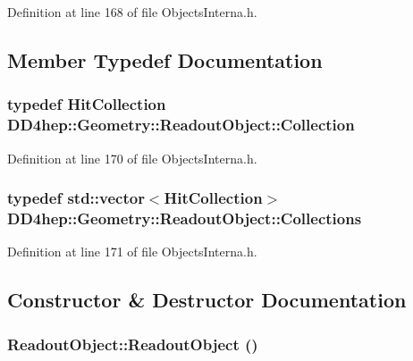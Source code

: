 Definition at line 168 of file ObjectsInterna.h.

\subsection{Member Typedef Documentation}
\hypertarget{class_d_d4hep_1_1_geometry_1_1_readout_object_a3789c1e548f014ce44e2af9ff12f9757}{
\subsubsection[{Collection}]{\setlength{\rightskip}{0pt plus 5cm}typedef {\bf HitCollection} {\bf DD4hep::Geometry::ReadoutObject::Collection}}}
\label{class_d_d4hep_1_1_geometry_1_1_readout_object_a3789c1e548f014ce44e2af9ff12f9757}


Definition at line 170 of file ObjectsInterna.h.\hypertarget{class_d_d4hep_1_1_geometry_1_1_readout_object_a1093be792a71654cf6116686b0ab7cb6}{
\subsubsection[{Collections}]{\setlength{\rightskip}{0pt plus 5cm}typedef std::vector$<${\bf HitCollection}$>$ {\bf DD4hep::Geometry::ReadoutObject::Collections}}}
\label{class_d_d4hep_1_1_geometry_1_1_readout_object_a1093be792a71654cf6116686b0ab7cb6}


Definition at line 171 of file ObjectsInterna.h.

\subsection{Constructor \& Destructor Documentation}
\hypertarget{class_d_d4hep_1_1_geometry_1_1_readout_object_a996d7d31d97422f508786b6ba827fb84}{
\subsubsection[{ReadoutObject}]{\setlength{\rightskip}{0pt plus 5cm}ReadoutObject::ReadoutObject ()}}
\label{class_d_d4hep_1_1_geometry_1_1_readout_object_a996d7d31d97422f508786b6ba827fb84}


